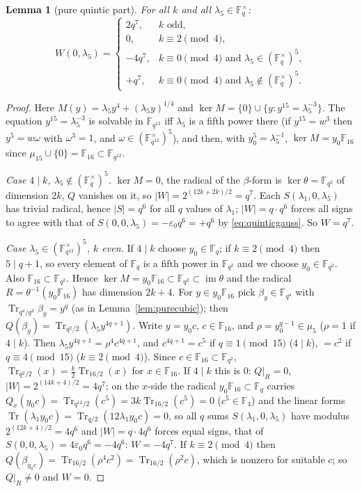 \documentclass[11pt,a4paper]{amsart}
\newtheorem{lemma}[theorem]{Lemma}
\theoremstyle{definition}
\newcommand{\F}{\mathbb{F}}
\newcommand{\Tr}{\operatorname{Tr}}
\newcommand{\im}{\operatorname{im}}
\newcommand{\sgn}{\varepsilon_0}
\begin{document}
\begin{lemma}[pure quintic part]\label{lem:purequintic}
For all $k$ and all $\lambda_5\in\F_q^\times$:
\[
W(0,\lambda_5)=\begin{cases}2q^7,&k\text{ odd},\\ 0,&k\equiv2\pmod4,\\ -4q^7,&k\equiv0\pmod4\text{ and }\lambda_5\in(\F_q^\times)^5,\\ +q^7,&k\equiv0\pmod4\text{ and }\lambda_5\notin(\F_q^\times)^5.\end{cases}
\]
\end{lemma}
\begin{proof}
Here $M(y)=\lambda_5y^4+(\lambda_5y)^{1/4}$ and $\ker M=\{0\}\cup\{y:y^{15}=\lambda_5^{-3}\}$. The equation $y^{15}=\lambda_5^{-3}$ is solvable in $\F_{q^{12}}$ iff $\lambda_5$ is a fifth power there (if $y^{15}=w^3$ then $y^5=w\omega$ with $\omega^3=1$, and $\omega\in(\F_{q^{12}}^\times)^5$), and then, with $y_0^5=\lambda_5^{-1}$, $\ker M=y_0\F_{16}$ since $\mu_{15}\cup\{0\}=\F_{16}\subset\F_{q^{12}}$.

\emph{Case $4\mid k$, $\lambda_5\notin(\F_q^\times)^5$.} $\ker M=0$, the radical of the $\beta$-form is $\ker\theta=\F_{q^2}$ of dimension $2k$, $Q$ vanishes on it, so $|W|=2^{(12k+2k)/2}=q^7$. Each $S(\lambda_1,0,\lambda_5)$ has trivial radical, hence $|S|=q^6$ for all $q$ values of $\lambda_1$; $|W|=q\cdot q^6$ forces all signs to agree with that of $S(0,0,\lambda_5)=-\sgn q^6=+q^6$ by \eqref{eq:quinticgauss}. So $W=q^7$.

\emph{Case $\lambda_5\in(\F_{q^{12}}^\times)^5$, $k$ even.} If $4\mid k$ choose $y_0\in\F_q$; if $k\equiv2\pmod4$ then $5\mid q+1$, so every element of $\F_q$ is a fifth power in $\F_{q^2}$ and we choose $y_0\in\F_{q^2}$. Also $\F_{16}\subset\F_{q^2}$. Hence $\ker M=y_0\F_{16}\subset\F_{q^2}\subset\im\theta$ and the radical $R=\theta^{-1}(y_0\F_{16})$ has dimension $2k+4$. For $y\in y_0\F_{16}$ pick $\beta_y\in\F_{q^4}$ with $\Tr_{q^4/q^2}\beta_y=y^q$ (as in Lemma~\ref{lem:purecubic}); then $Q(\beta_y)=\Tr_{q^2/2}(\lambda_5y^{4q+1})$. Write $y=y_0c$, $c\in\F_{16}$, and $\rho=y_0^{q-1}\in\mu_5$ ($\rho=1$ if $4\mid k$). Then $\lambda_5y^{4q+1}=\rho^4c^{4q+1}$, and $c^{4q+1}=c^5$ if $q\equiv1\pmod{15}$ ($4\mid k$), $=c^2$ if $q\equiv4\pmod{15}$ ($k\equiv2\pmod 4$). Since $c\in\F_{16}\subset\F_{q^2}$, $\Tr_{q^2/2}(x)=\frac k2\Tr_{16/2}(x)$ for $x\in\F_{16}$. If $4\mid k$ this is $0$: $Q|_R=0$, $|W|=2^{(14k+4)/2}=4q^7$; on the $x$-side the radical $y_0\F_{16}\subset\F_q$ carries $Q_x(y_0c)=\Tr_{q^{12}/2}(c^5)=3k\Tr_{16/2}(c^5)=0$ ($c^5\in\F_4$) and the linear forms $\Tr(\lambda_1y_0c)=\Tr_{q/2}(12\lambda_1y_0c)=0$, so all $q$ sums $S(\lambda_1,0,\lambda_5)$ have modulus $2^{(12k+4)/2}=4q^6$ and $|W|=q\cdot4q^6$ forces equal signs, that of $S(0,0,\lambda_5)=4\sgn q^6=-4q^6$: $W=-4q^7$. If $k\equiv2\pmod4$ then $Q(\beta_{y_0c})=\Tr_{16/2}(\rho^4c^2)=\Tr_{16/2}(\rho^2c)$, which is nonzero for suitable $c$; so $Q|_R\ne0$ and $W=0$.


\end{proof}
\end{document}
